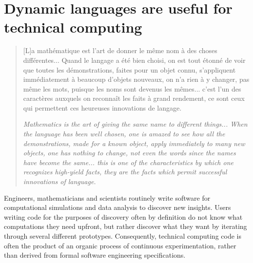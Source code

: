 \documentclass[pldi]{sigplanconf-pldi15}
\begin{document}
\tableofcontents %

\section{Dynamic languages are useful for technical computing}

\begin{quote}
	[L]a math\'ematique est l'art de donner le m\^eme nom \`a des choses
	diff\'erentes... Quand le langage a \'et\'e bien choisi, on est tout \'etonn\'e
	de voir que toutes les d\'emonstrations, faites pour un objet connu,
	s'appliqu\-ent imm\'ediatement \`a beaucoup d'objets nouveaux, on n'a rien \`a
	y changer, pas m\^eme les mots, puisque les noms sont devenus les
	m\^emes... c'est l'un des caract\`eres auxquels on reconna\^it les faits \`a
	grand rendement, ce sont ceux qui permettent ces heureuses
	innovations de langage. \cite{Poincare1908}
	
	\textit{Mathematics is the art of giving the same name to different
	things... When the language has been well chosen, one is amazed to see
	how all the demonstrations, made for a known object, apply immediately
	to many new objects, one has nothing to change, not even the words
	since the names have become the same... this is one of the
	characteristics by which one recognizes high-yield facts, they are the
	facts which permit successful innovations of language.}
\end{quote}

Engineers, mathematicians and scientists routinely write software for
computational simulations and data analysis to discover new insights.
Users writing code for the purposes of discovery often by definition do not
know what computations they need upfront, but rather discover what they want by
iterating through several different prototypes. Consequently, technical
computing code is often the product of an organic process of continuous
experimentation, rather than derived from formal software engineering
specifications.
\end{document}
